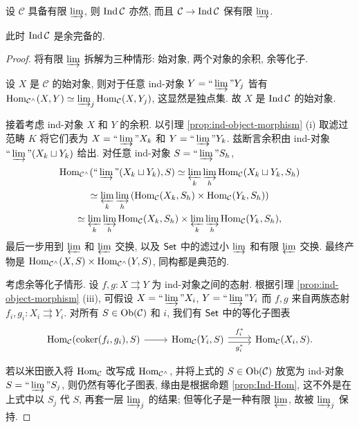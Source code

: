 \begin{lemma}\label{prop:Ind-colim}
	设 $\mathcal{C}$ 具备有限 $\varinjlim$, 则 $\operatorname{Ind}\mathcal{C}$ 亦然, 而且 $\mathcal{C} \to \operatorname{Ind}\mathcal{C}$ 保有限 $\varinjlim$.
	
	此时 $\operatorname{Ind}\mathcal{C}$ 是余完备的.
\end{lemma}
\begin{proof}
	将有限 $\varinjlim$ 拆解为三种情形: 始对象, 两个对象的余积, 余等化子.
	
	设 $X$ 是 $\mathcal{C}$ 的始对象, 则对于任意 ind-对象 $Y = \Yinjlim Y_j$ 皆有 $\operatorname{Hom}_{\mathcal{C}^\wedge}(X, Y) \simeq \varinjlim_j \operatorname{Hom}_{\mathcal{C}}(X, Y_j)$, 这显然是独点集. 故 $X$ 是 $\operatorname{Ind}\mathcal{C}$ 的始对象.
	
	接着考虑 ind-对象 $X$ 和 $Y$ 的余积. 以引理 \ref{prop:ind-object-morphism} (i) 取滤过范畴 $K$ 将它们表为 $X = \Yinjlim X_k$ 和 $Y = \Yinjlim Y_k$. 兹断言余积由 ind-对象 $\Yinjlim (X_k \sqcup Y_k)$ 给出. 对任意 ind-对象 $S = \Yinjlim S_h$,
	\begin{multline*}
		\Hom_{\mathcal{C}^\wedge}(\Yinjlim (X_k \sqcup Y_k), S) \simeq \varprojlim_k \varinjlim_h \Hom_{\mathcal{C}}(X_k \sqcup Y_k, S_h) \\
		\simeq \varprojlim_k \varinjlim_h \left( \Hom_{\mathcal{C}}(X_k, S_h) \times \Hom_{\mathcal{C}}(Y_k, S_h) \right) \\
		\simeq \varprojlim_k \varinjlim_h \Hom_{\mathcal{C}}(X_k, S_h) \times \varprojlim_k \varinjlim_h \Hom_{\mathcal{C}}(Y_k, S_h),
	\end{multline*}
	最后一步用到 $\varprojlim$ 和 $\varprojlim$ 交换, 以及  $\mathsf{Set}$ 中的滤过小 $\varinjlim$ 和有限 $\varprojlim$ 交换. 最终产物是 $\operatorname{Hom}_{\mathcal{C}^\wedge}(X, S) \times \operatorname{Hom}_{\mathcal{C}^\wedge}(Y, S)$, 同构都是典范的.
	
	考虑余等化子情形. 设 $f, g: X \rightrightarrows Y$ 为 ind-对象之间的态射. 根据引理 \ref{prop:ind-object-morphism} (iii), 可假设 $X = \Yinjlim X_i$, $Y = \Yinjlim Y_i$ 而 $f, g$ 来自两族态射 $f_i, g_i: X_i \rightrightarrows Y_i$. 对所有 $S \in \operatorname{Ob}(\mathcal{C})$ 和 $i$, 我们有 $\mathsf{Set}$ 中的等化子图表
	\[\begin{tikzcd}
		\Hom_{\mathcal{C}}(\Coker(f_i, g_i), S) \arrow[r] &
		\Hom_{\mathcal{C}}(Y_i, S) \arrow[r, shift left, "{f_i^*}"] \arrow[r, shift right, "{g_i^*}"'] & \Hom_{\mathcal{C}}(X_i, S).
	\end{tikzcd}\]
	
	若以米田嵌入将 $\operatorname{Hom}_{\mathcal{C}}$ 改写成 $\operatorname{Hom}_{\mathcal{C}^\wedge}$, 并将上式的 $S \in \operatorname{Ob}(\mathcal{C})$ 放宽为 ind-对象 $S = \Yinjlim S_j$, 则仍然有等化子图表, 缘由是根据命题 \ref{prop:Ind-Hom}, 这不外是在上式中以 $S_j$ 代 $S$, 再套一层 $\varinjlim_j$ 的结果; 但等化子是一种有限 $\varprojlim$, 故被 $\varinjlim_j$ 保持.
	

\end{proof}
